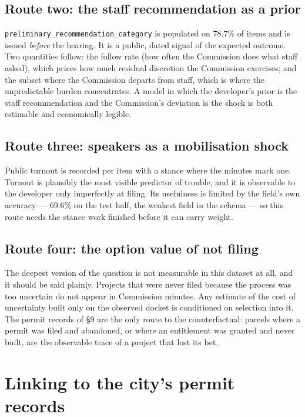 \documentclass[11pt]{article}
\begin{document}
\subsection{Route two: the staff recommendation as a prior}

\texttt{preliminary\_recommendation\_category} is populated on 78.7\% of items and is issued
\emph{before} the hearing. It is a public, dated signal of the expected outcome. Two
quantities follow: the follow rate (how often the Commission does what staff asked), which
prices how much residual discretion the Commission exercises; and the subset where the
Commission departs from staff, which is where the unpredictable burden concentrates. A model
in which the developer's prior is the staff recommendation and the Commission's deviation is
the shock is both estimable and economically legible.

\subsection{Route three: speakers as a mobilisation shock}

Public turnout is recorded per item with a stance where the minutes mark one. Turnout is
plausibly the most visible predictor of trouble, and it is observable to the developer only
imperfectly at filing. Its usefulness is limited by the field's own accuracy --- 69.6\% on
the test half, the weakest field in the schema --- so this route needs the stance work
finished before it can carry weight.

\subsection{Route four: the option value of not filing}

The deepest version of the question is not measurable in this dataset at all, and it should be
said plainly. Projects that were never filed because the process was too uncertain do not
appear in Commission minutes. Any estimate of the cost of uncertainty built only on the
observed docket is conditioned on selection into it. The permit records of \S9 are the only
route to the counterfactual: parcels where a permit was filed and abandoned, or where an
entitlement was granted and never built, are the observable trace of a project that lost its
bet.

\section{Linking to the city's permit records}
\label{sec:permits}
\end{document}
